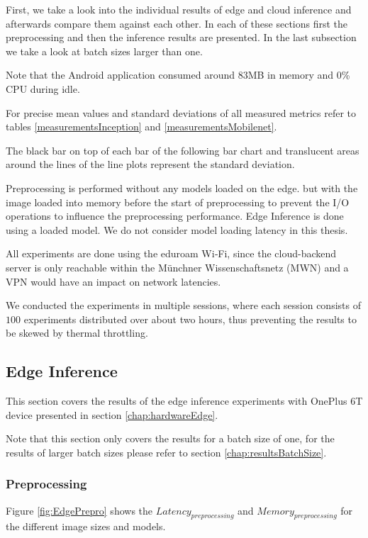 First, we take a look into the individual results of edge and cloud inference and afterwards compare them against each other. In each of these sections first the preprocessing and then the inference results are presented. 
In the last subsection we take a look at batch sizes larger than one.

Note that the Android application consumed around 83MB in memory and 0\% CPU during idle.

For precise mean values and standard deviations of all measured metrics refer to tables \ref{measurementsInception} and \ref{measurementsMobilenet}.

The black bar on top of each bar of the following bar chart and translucent areas around the lines of the line plots represent the standard deviation.

Preprocessing is performed without any models loaded on the edge. but with the image loaded into memory before the start of preprocessing to prevent the I/O operations to influence the preprocessing performance.
Edge Inference is done using a loaded model. We do not consider model loading latency in this thesis.

All experiments are done using the eduroam Wi‑Fi, since the cloud-backend server is only reachable within the Münchner Wissenschaftsnetz (MWN) and a VPN would have an impact on network latencies.

We conducted the experiments in multiple sessions, where each session consists of $100$ experiments distributed over about two hours, thus preventing the results to be skewed by thermal throttling.
\subsection{Edge Inference}
This section covers the results of the edge inference experiments with OnePlus 6T device presented in section \ref{chap:hardwareEdge}.

Note that this section only covers the results for a batch size of one, for the results of larger batch sizes please refer to section \ref{chap:resultsBatchSize}.
\subsubsection{Preprocessing}
\label{chap:edgePrepro}
Figure \ref{fig:EdgePrepro} shows the $Latency_{preprocessing}$ and $Memory_{preprocessing}$ for the different image sizes and models.

